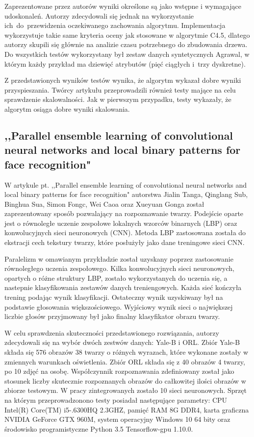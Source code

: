 \documentclass[12pt]{article}
\begin{document}
Zaprezentowane przez autorów wyniki określone są jako wstępne i wymagające udoskonaleń. Autorzy zdecydowali się jednak na wykorzystanie ich~do~przewidzenia oczekiwanego
zachowania algorytmu. Implementacja wykorzystuje takie same kryteria oceny jak stosowane w algorytmie C4.5, dlatego autorzy skupili się głównie na analizie czasu potrzebnego do
zbudowania drzewa. Do wszystkich testów wykorzystany był zestaw danych syntetycznych Agrawal, w którym każdy przykład ma dziewięć atrybutów (pięć ciągłych i~trzy dyskretne).

Z przedstawionych wyników testów wynika, że algorytm wykazał dobre wyniki przyspieszania. Twórcy artykułu przeprowadzili również testy mające na celu sprawdzenie skalowalności.
Jak w pierwszym przypadku, testy wykazały, że algorytm osiąga dobre wyniki skalowania.

\subsection{,,Parallel ensemble learning of convolutional neural networks and local binary patterns for face recognition"}

W artykule pt. ,,Parallel ensemble learning of convolutional neural networks and local binary patterns for face recognition" autorstwa Jialin Tanga, Qinglang Sub, Binghua Sua,
Simon Fongc, Wei Caoa oraz Xueyuan Gonga został zaprezentowany sposób pozwalający na rozpoznawanie twarzy. Podejście oparte jest o równoległe uczenie zespołowe lokalnych
wzorców binarnych (LBP) oraz konwolucyjnych sieci neuronowych (CNN). Metoda LBP zastosowana została do ekstracji cech tekstury twarzy, które posłużyły jako dane treningowe
sieci CNN.

Paralelizm w omawianym przykładzie został uzyskany poprzez zastosowanie równoległego uczenia zespołowego. Kilka konwolucyjnych sieci neuronowych, opartych o różne
struktury LBP, zostało wykorzystanych do uczenia się, a nastepnie klasyfikowania zestawów danych treniengowych. Każda sieć kończyła trening podając wynik klasyfikacji. Ostateczny
wynik uzyskiwany był na podstawie głosowania większościowego. Wyjściowy wynik sieci o największej liczbie głosów przyjmowany był jako finalny klasyfikator obrazu twarzy.

W celu sprawdzenia skuteczności przedstawionego rozwiązania, autorzy zdecydowali się na wybór dwóch zestwów danych: Yale-B i ORL. Zbiór Yale-B składa się 576 obrazów 38 twarzy
o różnych wyrazach, które wykonane zostały w zmiennych warunkach oświetlenia. Zbiór ORL składa się z 40 obrazów 4 twarzy, po 10 zdjęć na osobę. Współczynnik rozpoznawania
zdefiniowany został jako stosunek liczby skutecznie rozpoznanych obrazów do całkowitej ilości obrazów w zbiorze testowym. W pracy zintegrowanych zostało 10 sieci neuronowych.
Sprzęt na którym przeprowadzonono testy posiadał następujące parametry: CPU Intel(R) Core(TM) i5-.6300HQ 2.3GHZ, pamięć RAM 8G DDR4, karta graficzna NVIDIA GeForce GTX 960M,
system operacyjny Windows 10 64 bity oraz środowisko programistyczne Python 3.5 Tensorflow-gpu 1.10.0.
\end{document}
